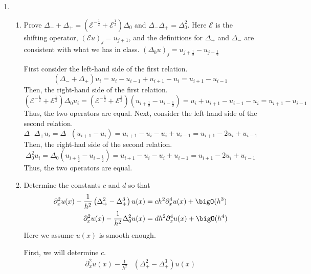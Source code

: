 \documentclass{article}
\newcommand\NoIndent[1]{%
  \begingroup
  \par
  \parshape0
  #1\par
  \endgroup
}
\begin{document}
\begin{enumerate}
	\item \begin{enumerate}
		\item Prove
			$\Delta_- + \Delta_+ =
				\left(\mathcal{E}^{-\frac{1}{2}} + \mathcal{E}^\frac{1}{2}\right)\Delta_0$
			and $\Delta_-\Delta_+ = \Delta_0^2$.
			Here $\mathcal{E}$ is the shifting operator, $\left(\mathcal{E}u\right)_j = u_{j+1}$,
			and the definitions for $\Delta_+$ and $\Delta_-$ are consistent with what we has in class.
			$\left(\Delta_0 u\right)_j = u_{j+\frac{1}{2}} - u_{j-\frac{1}{2}}$
\NoIndent{
	First consider the left-hand side of the first relation.
	\begin{equation*}
		\left(\Delta_- + \Delta_+\right)u_i = u_i - u_{i-1} + u_{i+1} - u_i = u_{i+1} - u_{i-1}
	\end{equation*}
	Then, the right-hand side of the first relation.
	\begin{equation*}
		\left(\mathcal{E}^{-\frac{1}{2}} + \mathcal{E}^\frac{1}{2}\right)\Delta_0 u_i =
			\left(\mathcal{E}^{-\frac{1}{2}} + \mathcal{E}^\frac{1}{2}\right)
				\left(u_{i+\frac{1}{2}} - u_{i-\frac{1}{2}}\right) =
			u_i + u_{i+1} - u_{i-1} - u_i = u_{i+1} - u_{i-1}
	\end{equation*}
	Thus, the two operators are equal.
	Next, consider the left-hand side of the second relation.
	\begin{equation*}
		\Delta_-\Delta_+ u_i = \Delta_-\left(u_{i+1} - u_i\right) = u_{i+1} - u_i - u_i + u_{i-1} =
			u_{i+1} - 2u_i + u_{i-1}
	\end{equation*}
	Then, the right-had side of the second relation.
	\begin{equation*}
		\Delta_0^2 u_i = \Delta_0\left(u_{i+\frac{1}{2}} - u_{i-\frac{1}{2}}\right) =
			u_{i+1} - u_i - u_i + u_{i-1} = u_{i+1} - 2u_i + u_{i-1}
	\end{equation*}
	Thus, the two operators are equal.
}
		\item Determine the constants $c$ and $d$ so that
			\begin{align*}
				\partial_x^2 u(x) - \frac{1}{h^2}\left(\Delta_+^2 - \Delta_+^3\right)u(x)
					&= ch^2\partial_x^4 u(x) + \bigO(h^3) \\
				\partial_x^2 u(x) - \frac{1}{h^2}\Delta_0^2 u(x) &= dh^2\partial_x^4 u(x) + \bigO(h^4)
			\end{align*}
			Here we assume $u(x)$ is smooth enough.
\NoIndent{
	First, we will determine $c$.
	\begin{align*}
		\partial_x^2 u(x) - \frac{1}{h^2}&\left(\Delta_+^2 - \Delta_+^3\right)u(x)  \\

\end{align*}}
\end{enumerate}
\end{enumerate}
\end{document}
